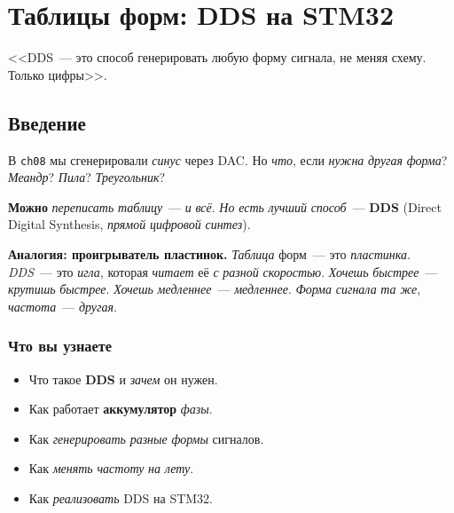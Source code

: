 
\chapter{Таблицы форм: DDS на STM32}
\label{ch:dds}

\epigraph{<<DDS~--- это способ генерировать любую форму
сигнала, не меняя схему. Только цифры>>.}{}

\section{Введение}
\label{sec:dds-intro}

В \texttt{ch08} мы сгенерировали \emph{синус} через DAC.
Но \emph{что}, если \emph{нужна} \emph{другая} \emph{форма}?
\emph{Меандр}? \emph{Пила}? \emph{Треугольник}?

\textbf{Можно} \emph{переписать} \emph{таблицу}~--- \emph{и}
\emph{всё}. \emph{Но} \emph{есть} \emph{лучший} \emph{способ}~---
\textbf{DDS} (Direct Digital Synthesis, \emph{прямой}
\emph{цифровой} \emph{синтез}).

\begin{ideabox}
\textbf{Аналогия: проигрыватель пластинок.} \emph{Таблица}
форм~--- это \emph{пластинка}. \emph{DDS}~--- это
\emph{игла}, которая \emph{читает} её \emph{с} \emph{разной}
\emph{скоростью}. \emph{Хочешь} \emph{быстрее}~---
\emph{крутишь} \emph{быстрее}. \emph{Хочешь} \emph{медленнее}~---
\emph{медленнее}. \emph{Форма} \emph{сигнала} \emph{та} \emph{же},
\emph{частота}~--- \emph{другая}.
\end{ideabox}

\subsection{Что вы узнаете}

\begin{itemize}
    \item Что такое \textbf{DDS} и \emph{зачем} он нужен.
    \item Как работает \textbf{аккумулятор} \emph{фазы}.
    \item Как \emph{генерировать} \emph{разные} \emph{формы}
          сигналов.
    \item Как \emph{менять} \emph{частоту} \emph{на} \emph{лету}.
    \item Как \emph{реализовать} DDS на STM32.
\end{itemize}

